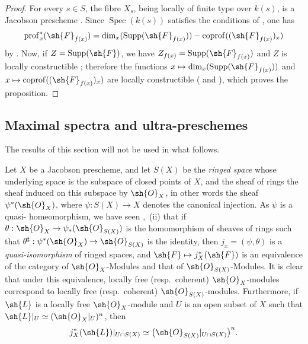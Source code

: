 \begin{proof}
For every $s\in S$, the fibre $X_s$, being locally of finite type over $k(s)$, is a Jacobson prescheme . Since $\operatorname{Spec}(k(s))$ satisfies the conditions of , one has
\[
  \operatorname{prof}^*_x(\sh{F}_{f(x)})
  =\dim_x(\operatorname{Supp}(\sh{F}_{f(x)}))
   -\operatorname{coprof}((\sh{F}_{f(x)})_x)
\]
by .
Now, if $Z=\operatorname{Supp}(\sh{F})$, we have $Z_{f(x)}=\operatorname{Supp}(\sh{F}_{f(x)})$  and $Z$ is locally constructible ; therefore the functions $x\mapsto\dim_x(\operatorname{Supp}(\sh{F}_{f(x)}))$ and $x\mapsto\operatorname{coprof}((\sh{F}_{f(x)})_x)$ are locally constructible ( and ), which proves the proposition.
\end{proof}

\subsection{Maximal spectra and ultra-preschemes}
\label{subsection:IV.10.9}

The results of this section will not be used in what follows.

\begin{env}[10.9.1]
\label{IV.10.9.1}
Let $X$ be a Jacobson prescheme, and let $S(X)$ be the \emph{ringed space} whose underlying space is the subspace of closed points of $X$, and the sheaf of rings the sheaf induced on this subspace by $\sh{O}_X$, in other words the sheaf $\psi^*(\sh{O}_X)$, where $\psi:S(X)\to X$ denotes the canonical injection.
As $\psi$ is a quasi-
homeomorphism, we have seen ,~(ii) that if $\theta:\sh{O}_X\to\psi_*(\sh{O}_{S(X)})$ is the homomorphism of sheaves of rings such that $\theta^\sharp:\psi^*(\sh{O}_X)\to\sh{O}_{S(X)}$ is the identity, then $j_x=(\psi,\theta)$ is a \emph{quasi-isomorphism} of ringed spaces, and $\sh{F}\mapsto j_X^*(\sh{F})$ is an equivalence of the category of $\sh{O}_X$-Modules and that of $\sh{O}_{S(X)}$-Modules.
It is clear that under this equivalence, locally free (resp.\ coherent) $\sh{O}_X$-modules correspond to locally free (resp.\ coherent) $\sh{O}_{S(X)}$-modules. Furthermore, if $\sh{L}$ is a locally free $\sh{O}_X$-module and $U$ is an open subset of $X$ such that $\sh{L}|_U\simeq(\sh{O}_X|_U)^n$, then
\[
  j_X^*(\sh{L})|_{U\cap S(X)}
  \simeq \bigl(\sh{O}_{S(X)}|_{U\cap S(X)}\bigr)^n.
\]
\end{env}

